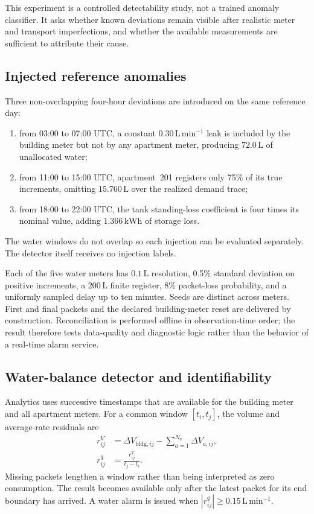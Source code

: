 \documentclass[11pt,a4paper]{article}
\begin{document}
This experiment is a controlled detectability study, not a trained anomaly
classifier. It asks whether known deviations remain visible after realistic
meter and transport imperfections, and whether the available measurements are
sufficient to attribute their cause.

\subsection{Injected reference anomalies}
Three non-overlapping four-hour deviations are introduced on the same reference
day:
\begin{enumerate}
  \item from 03:00 to 07:00 UTC, a constant
  $0.30\,\mathrm{L\,min^{-1}}$ leak is included by the building meter but not
  by any apartment meter, producing $72.0\,\mathrm{L}$ of unallocated water;
  \item from 11:00 to 15:00 UTC, apartment~201 registers only 75\% of its true
  increments, omitting $15.760\,\mathrm{L}$ over the realized demand trace;
  \item from 18:00 to 22:00 UTC, the tank standing-loss coefficient is four
  times its nominal value, adding $1.366\,\mathrm{kWh}$ of storage loss.
\end{enumerate}
The water windows do not overlap so each injection can be evaluated separately.
The detector itself receives no injection labels.

Each of the five water meters has $0.1\,\mathrm{L}$ resolution, 0.5\% standard
deviation on positive increments, a $200\,\mathrm{L}$ finite register, 8\%
packet-loss probability, and a uniformly sampled delay up to ten minutes.
Seeds are distinct across meters. First and final packets and the declared
building-meter reset are delivered by construction. Reconciliation is performed
offline in observation-time order; the result therefore tests data-quality and
diagnostic logic rather than the behavior of a real-time alarm service.

\subsection{Water-balance detector and identifiability}
Analytics uses successive timestamps that are available for the building meter
and all apartment meters. For a common window $[t_i,t_j]$, the volume and
average-rate residuals are
\begin{align}
  r^V_{ij}
    &= \Delta V_{\mathrm{bldg},ij}
       - \sum_{a=1}^{N_a}\Delta V_{a,ij},\\
  r^q_{ij} &= \frac{r^V_{ij}}{t_j-t_i}.
\end{align}
Missing packets lengthen a window rather than being interpreted as zero
consumption. The result becomes available only after the latest packet for its
end boundary has arrived. A water alarm is issued when
$|r^q_{ij}|\geq 0.15\,\mathrm{L\,min^{-1}}$.
\end{document}
